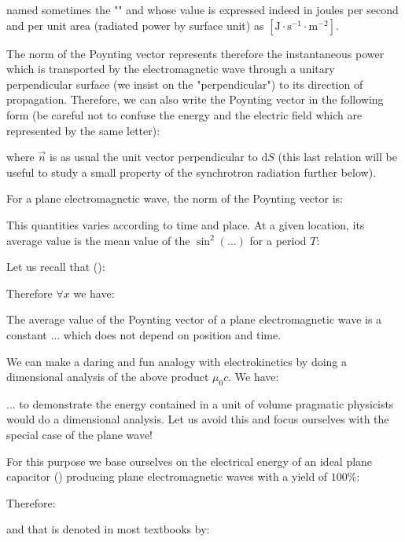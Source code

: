 	named sometimes the "" and whose value is expressed indeed in joules per second and per unit area (radiated power by surface unit) as $[\text{J}\cdot\text{s}^{-1}\cdot\text{m}^{-2}]$.

	The norm of the Poynting vector represents therefore the instantaneous power which is transported by the electromagnetic wave through a unitary perpendicular surface (we insist on the "perpendicular") to its direction of propagation. Therefore, we can also write the Poynting vector in the following form (be careful not to confuse the energy and the electric field which are represented by the same letter):
	
	where $\vec{n}$ is as usual the unit vector perpendicular to $\mathrm{d}S$ (this last relation will be useful to study a small property of the synchrotron radiation further below).

	For a plane electromagnetic wave, the norm of the Poynting vector is:
	
	This quantities varies according to time and place. At a given location, its average value is the mean value of the $\sin^2(\ldots)$ for a period $T$:
	
	Let us recall that ():
	
	Therefore $\forall x$ we have:
	
	The average value of the Poynting vector of a plane electromagnetic wave is a constant ... which does not depend on position and time.
	
	\begin{tcolorbox}[title=Remark,colframe=black,arc=10pt]
	We can make a daring and fun analogy with electrokinetics by doing a dimensional analysis of the above product $\mu_0c$. We have:
	
	\end{tcolorbox}
	... to demonstrate the energy contained in a unit of volume pragmatic physicists would do a dimensional analysis. Let us avoid this and focus ourselves with the special case of the plane wave!

	For this purpose we base ourselves on the electrical energy of an ideal plane capacitor () producing plane electromagnetic waves with a yield of $100\%$:
	
	Therefore:
	
	and that is denoted in most textbooks by:
	
